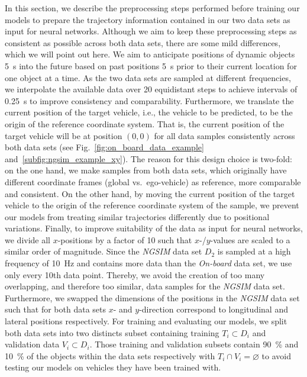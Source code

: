 In this section, we describe the preprocessing steps performed before training our models to prepare the trajectory information contained in our two data sets as input for neural networks.
Although we aim to keep these preprocessing steps as consistent as possible across both data sets, there are some mild differences, which we will point out here.
We aim to anticipate positions of dynamic objects \SI{5}{\second} into the future based on past positions \SI{5}{\second} prior to their current location for one object at a time.
As the two data sets are sampled at different frequencies, we interpolate the available data over \num{20} equidistant steps to achieve intervals of \SI{0.25}{\second} to improve consistency and comparability.
Furthermore, we translate the current position of the target vehicle, i.e., the vehicle to be predicted, to be the origin of the reference coordinate system.
That is, the current position of the target vehicle will be at position $\left(0,0\right)$ for all data samples consistently across both data sets (see Fig.~\ref{fig:on_board_data_example} and~\ref{subfig:ngsim_example_xy}).
The reason for this design choice is two-fold: on the one hand, we make samples from both data sets, which originally have different coordinate frames (global vs.\ ego-vehicle) as reference, more comparable and consistent.
On the other hand, by moving the current position of the target vehicle to the origin of the reference coordinate system of the sample, we prevent our models from treating similar trajectories differently due to positional variations.
Finally, to improve suitability of the data as input for neural networks, we divide all $x$-positions by a factor of \num{10} such that $x$-/$y$-values are scaled to a similar order of magnitude.
Since the \emph{\acs{NGSIM}} data set $D_2$ is sampled at a high frequency of \SI{10}{\hertz} and contains more data than the \emph{On-board} data set, we use only every \num{10}th data point.
Thereby, we avoid the creation of too many overlapping, and therefore too similar, data samples for the \emph{\ac{NGSIM}} data set.
Furthermore, we swapped the dimensions of the positions in the \emph{\ac{NGSIM}} data set such that for both data sets $x$- and $y$-direction correspond to longitudinal and lateral positions respectively.
For training and evaluating our models, we split both data sets into two distincts subset containing training $T_i \subset D_i$ and validation data $V_i \subset D_i$.
Those training and validation subsets contain \SI{90}{\percent} and \SI{10}{\percent} of the objects within the data sets respectively with $T_i \cap V_i = \varnothing$ to avoid testing our models on vehicles they have been trained with.


